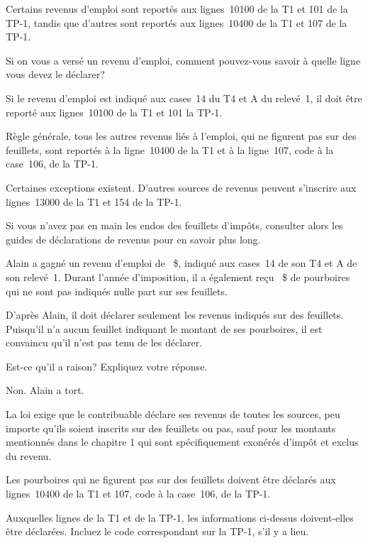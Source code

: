 \begin{question}
	Certains revenus d'emploi sont reportés aux lignes~10100 de la T1 et 101 de la TP-1, tandis que d'autres sont reportés aux lignes~10400 de la T1 et 107 de la TP-1. 
	
	Si on vous a versé un revenu d'emploi, comment pouvez-vous savoir à quelle ligne vous devez le déclarer?
\end{question}
Si le revenu d'emploi est indiqué aux cases~14 du T4 et A du relevé~1, il doit être reporté aux lignes~10100 de la T1 et 101 la TP-1.

Règle générale, tous les autres revenus liés à l'emploi, qui ne figurent pas sur des feuillets, sont reportés à la ligne~10400 de la T1 et à la ligne~107, code \fg{} à la case~106, de la TP-1.

Certaines exceptions existent.
D'autres sources de revenus peuvent s'inscrire aux lignes~13000 de la T1 et 154 de la TP-1.

Si vous n'avez pas en main les endos des feuillets d'impôts, consulter alors les guides de déclarations de revenus pour en savoir plus long.

\begin{question}
	Alain a gagné un revenu d'emploi de ~\$, indiqué aux cases~14 de son T4 et A de son relevé~1. Durant l'année d'imposition, il a également reçu ~\$ de pourboires qui ne sont pas indiqués nulle part sur ses feuillets.
\end{question}
\setcounter{sousQuestion}{0}
\begin{sousQuestion}
	D'après Alain, il doit déclarer seulement les revenus indiqués sur des feuillets. Puisqu'il n'a aucun feuillet indiquant le montant de ses pourboires, il est convaincu qu'il n'est pas tenu de les déclarer. 
	
	Est-ce qu'il a raison? Expliquez votre réponse.
\end{sousQuestion}
Non. Alain a tort.

La loi exige que le contribuable déclare ses revenus de toutes les sources, peu importe qu'ils soient inscrits sur des feuillets ou pas, sauf pour les montants mentionnés dans le chapitre 1 qui sont spécifiquement exonérés d'impôt et exclus du revenu.

Les pourboires qui ne figurent pas sur des feuillets doivent être déclarés aux lignes~10400 de la T1 et 107, code \fg{} à la case~106, de la TP-1.

\begin{sousQuestion}
	Auxquelles lignes de la T1 et de la TP-1, les informations ci-dessus doivent-elles être déclarées. Incluez le code correspondant sur la TP-1, s'il y a lieu.
\end{sousQuestion}

